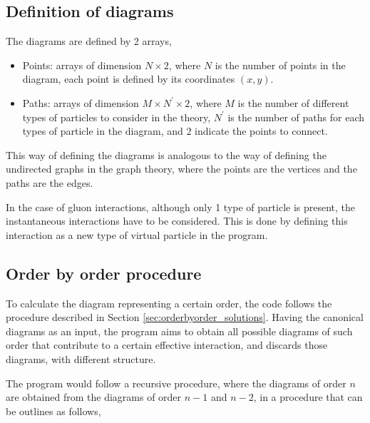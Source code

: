 \documentclass[11pt,a4paper,twoside,pdf]{article}
\numberwithin{equation}{section}
\begin{document}
\subsection{Definition of diagrams}

The diagrams are defined by 2 arrays, 
\begin{itemize}
    \item Points: arrays of dimension $N \times 2$, where $N$ is the number of 
    points in the diagram, each point is defined by its coordinates $(x,y)$.
    \item Paths: arrays of dimension $M \times N^\prime \times 2$, where $M$ is the
    number of different types of particles to consider in the theory, $N^\prime$ 
    is the number of paths for each types of particle in the diagram, and $2$ indicate
    the points to connect.
\end{itemize}

This way of defining the diagrams is analogous to the way of defining the undirected 
graphs in the graph theory, where the points are the vertices and the paths are the 
edges. 

In the case of gluon interactions, although only 1 type of particle is present, the
instantaneous interactions have to be considered. This is done by defining this 
interaction as a new type of virtual particle in the program.


\subsection{Order by order procedure}

To calculate the diagram representing a certain order, the code follows the 
procedure described in Section \ref{sec:orderbyorder_solutions}. Having the
canonical diagrams as an input, the program aims to obtain all possible diagrams of such order
that contribute to a certain effective interaction, and discards those diagrams, with
different structure.

The program would follow a recursive procedure, where the diagrams of order $n$ are
obtained from the diagrams of order $n-1$ and $n-2$, in a procedure that can be outlines
as follows,
\end{document}
